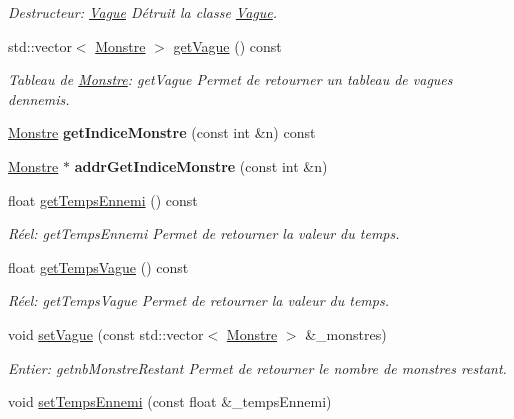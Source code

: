 \begin{DoxyCompactItemize}
\begin{DoxyCompactList}\small\item\em Destructeur\+: \hyperlink{classVague}{Vague} Détruit la classe \hyperlink{classVague}{Vague}. \end{DoxyCompactList}\item 
std\+::vector$<$ \hyperlink{classMonstre}{Monstre} $>$ \hyperlink{classVague_a9a23bacd87181f297f522152adb51c36}{get\+Vague} () const
\begin{DoxyCompactList}\small\item\em Tableau de \hyperlink{classMonstre}{Monstre}\+: get\+Vague Permet de retourner un tableau de vagues d\textquotesingle{}ennemis. \end{DoxyCompactList}\item 
\mbox{\label{classVague_af1356b21ff8e2eb3ed40e7c3a0419711}} 
\hyperlink{classMonstre}{Monstre} {\bfseries get\+Indice\+Monstre} (const int \&n) const
\item 
\mbox{\label{classVague_ab177d208c78c64cb636e3746431a4d16}} 
\hyperlink{classMonstre}{Monstre} $\ast$ {\bfseries addr\+Get\+Indice\+Monstre} (const int \&n)
\item 
float \hyperlink{classVague_a71f47253f6f4db49d994338a8088985c}{get\+Temps\+Ennemi} () const
\begin{DoxyCompactList}\small\item\em Réel\+: get\+Temps\+Ennemi Permet de retourner la valeur du temps. \end{DoxyCompactList}\item 
float \hyperlink{classVague_af665b6b2ec76931ebb9d5423446cfee8}{get\+Temps\+Vague} () const
\begin{DoxyCompactList}\small\item\em Réel\+: get\+Temps\+Vague Permet de retourner la valeur du temps. \end{DoxyCompactList}\item 
void \hyperlink{classVague_af6bc246e66011691775c3ceb9356ffc8}{set\+Vague} (const std\+::vector$<$ \hyperlink{classMonstre}{Monstre} $>$ \&\+\_\+monstres)
\begin{DoxyCompactList}\small\item\em Entier\+: getnb\+Monstre\+Restant Permet de retourner le nombre de monstres restant. \end{DoxyCompactList}\item 
void \hyperlink{classVague_ae9e45cad0c4a4da804f749e03952545c}{set\+Temps\+Ennemi} (const float \&\+\_\+temps\+Ennemi)

\end{DoxyCompactItemize}
